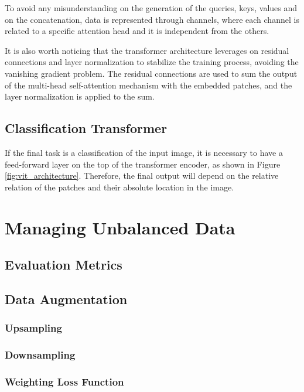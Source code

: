 To avoid any misunderstanding on the generation of the queries, keys, values and 
on the concatenation, data is represented through channels, where each channel is 
related to a specific attention head and it is independent from the others.

It is also worth noticing that the transformer architecture leverages on residual 
connections and layer normalization to stabilize the training process, avoiding 
the vanishing gradient problem. The residual connections are used to sum the 
output of the multi-head self-attention mechanism with the embedded patches, 
and the layer normalization is applied to the sum.

\subsection{Classification Transformer}
If the final task is a classification of the input image, it is necessary 
to have a feed-forward layer on the top of the transformer encoder, as shown in 
Figure \ref{fig:vit_architecture}.
Therefore, the final output will depend on the relative relation of the patches 
and their absolute location in the image.


\section{Managing Unbalanced Data}

\subsection{Evaluation Metrics}

\subsection{Data Augmentation}

\subsubsection{Upsampling}

\subsubsection{Downsampling}	

\subsubsection{Weighting Loss Function}

